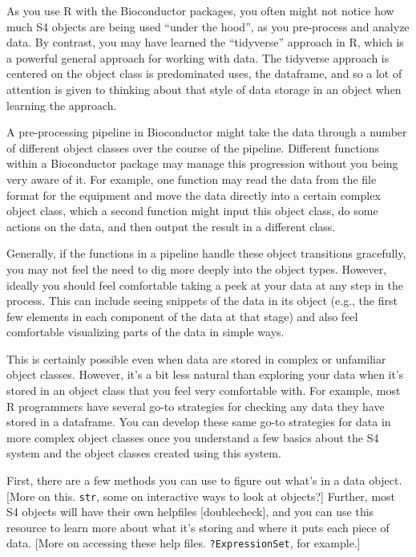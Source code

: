 \documentclass[]{tufte-book}
\begin{document}
As you use R with the Bioconductor packages, you often might not notice
how much S4 objects are being used ``under the hood'', as you pre-process
and analyze data. By contrast, you may have learned the ``tidyverse'' approach
in R, which is a powerful general approach for working with data. The
tidyverse approach is centered on the object class is predominated uses,
the dataframe, and so a lot of attention is given to thinking about that
style of data storage in an object when learning the approach.

A pre-processing pipeline in Bioconductor might take the data through a
number of different object classes over the course of the pipeline.
Different functions within a Bioconductor package may manage this
progression without you being very aware of it. For example, one function
may read the data from the file format for the equipment and move the
data directly into a certain complex object class, which a second function
might input this object class, do some actions on the data, and then output
the result in a different class.

Generally, if the functions in a pipeline handle these object transitions
gracefully, you may not feel the need to dig more deeply into the object
types. However, ideally you should feel comfortable taking a peek at your
data at any step in the process. This can include seeing snippets of the data
in its object (e.g., the first few elements in each component of the data
at that stage) and also feel comfortable visualizing parts of the data in
simple ways.

This is certainly possible even when data are stored in complex or unfamiliar
object classes. However, it's a bit less natural than exploring your data when
it's stored in an object class that you feel very comfortable with. For
example, most R programmers have several go-to strategies for checking any
data they have stored in a dataframe. You can develop these same go-to
strategies for data in more complex object classes once you understand
a few basics about the S4 system and the object classes created using this
system.

First, there are a few methods you can use to figure out what's in a data
object. {[}More on this. \texttt{str}, some on interactive ways to look at objects?{]}
Further, most S4 objects will have their own helpfiles {[}doublecheck{]}, and you
can use this resource to learn more about what it's storing and where it puts
each piece of data. {[}More on accessing these help files. \texttt{?ExpressionSet},
for example.{]}
\end{document}

